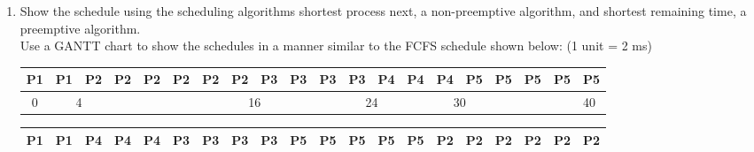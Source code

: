 \documentclass[12pt]{article}
\begin{document}
	\begin{enumerate}[label=\textbf{\alph*}.]
		\item Show the schedule using the scheduling algorithms shortest process next, a non-preemptive algorithm, and shortest remaining time, a preemptive algorithm. \\ Use a GANTT chart to show the schedules in a manner similar to the FCFS schedule shown below: (1 unit = 2 ms)
			\begin{table}[H]
				\centering
				\begin{adjustbox}{width=1\textwidth}
					\begin{tabular}{lcllllllllllllllllll}
					\hline
					\multicolumn{1}{|l|}{\textbf{P1}} & \multicolumn{1}{c|}{\textbf{P1}} & \multicolumn{1}{l|}{\textbf{P2}} & \multicolumn{1}{l|}{\textbf{P2}} & \multicolumn{1}{l|}{\textbf{P2}} & \multicolumn{1}{l|}{\textbf{P2}} & \multicolumn{1}{l|}{\textbf{P2}} & \multicolumn{1}{l|}{\textbf{P2}} & \multicolumn{1}{l|}{\textbf{P3}} & \multicolumn{1}{l|}{\textbf{P3}} & \multicolumn{1}{l|}{\textbf{P3}} & \multicolumn{1}{l|}{\textbf{P3}} & \multicolumn{1}{l|}{\textbf{P4}} & \multicolumn{1}{l|}{\textbf{P4}} & \multicolumn{1}{l|}{\textbf{P4}} & \multicolumn{1}{l|}{\textbf{P5}} & \multicolumn{1}{l|}{\textbf{P5}} & \multicolumn{1}{l|}{\textbf{P5}} & \multicolumn{1}{l|}{\textbf{P5}} & \multicolumn{1}{l|}{\textbf{P5}} \\ \hline
					\multicolumn{1}{c}{0}	& \multicolumn{2}{c}{4}	&	&	&	&	& \multicolumn{2}{c}{16}	&	&	& \multicolumn{2}{c}{24}	&	&	\multicolumn{2}{c}{30}	&	&	&	& 40                              
					\end{tabular}
				\end{adjustbox}
			\end{table}
			\begin{table}[H]
				\centering
				\begin{adjustbox}{width=1\textwidth}
					\begin{tabular}{lcllllllllllllllllll}
					\hline
					\multicolumn{1}{|l|}{\textbf{P1}} & \multicolumn{1}{c|}{\textbf{P1}} & \multicolumn{1}{l|}{\textbf{P4}} & \multicolumn{1}{l|}{\textbf{P4}} & \multicolumn{1}{l|}{\textbf{P4}} & \multicolumn{1}{l|}{\textbf{P3}} & \multicolumn{1}{l|}{\textbf{P3}} & \multicolumn{1}{l|}{\textbf{P3}} & \multicolumn{1}{l|}{\textbf{P3}} & \multicolumn{1}{l|}{\textbf{P5}} & \multicolumn{1}{l|}{\textbf{P5}} & \multicolumn{1}{l|}{\textbf{P5}} & \multicolumn{1}{l|}{\textbf{P5}} & \multicolumn{1}{l|}{\textbf{P5}} & \multicolumn{1}{l|}{\textbf{P2}} & \multicolumn{1}{l|}{\textbf{P2}} & \multicolumn{1}{l|}{\textbf{P2}} & \multicolumn{1}{l|}{\textbf{P2}} & \multicolumn{1}{l|}{\textbf{P2}} & \multicolumn{1}{l|}{\textbf{P2}} \\ \hline

\end{tabular}
\end{adjustbox}
\end{table}
\end{enumerate}
\end{document}
